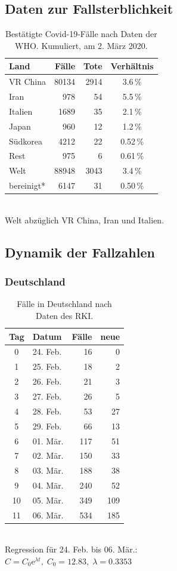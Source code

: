 \documentclass[a4paper,11pt,fleqn,twocolumn,twoside,dvipdfmx]{scrartcl}
\numberwithin{equation}{section}
\newcommand{\ee}{\mathrm e}
\newcommand{\strong}[1]{\textbf{#1}}
\begin{document}
\subsection{Daten zur Fallsterblichkeit}
\begin{table}[h]
\caption{Bestätigte Covid-19-Fälle\newline
nach Daten der WHO.\newline
Kumuliert, am 2. März 2020.}
\begin{tabular}{lrrc}
\toprule
\strong{Land} & \strong{Fälle} & \strong{Tote} & \strong{Verhältnis}\\
\midrule
VR China & 80134 & 2914 & 3.6\,\%\\
Iran & 978 & 54 & 5.5\,\%\\ 
Italien & 1689 & 35 & 2.1\,\%\\
Japan & 960 & 12 &  1.2\,\%\\
Südkorea & 4212 & 22 & 0.52\,\%\\
Rest & 975 & 6 & 0.61\,\%\\
\midrule
Welt & 88948 & 3043 & 3.4\,\%\\
bereinigt* & 6147 & 31 & 0.50\,\%\\
\bottomrule
\end{tabular}\\[4pt]
{\small *Welt abzüglich VR China, Iran und Italien.}
\end{table}

\subsection{Dynamik der Fallzahlen}

\subsubsection*{Deutschland}
\begin{table}[h]
\caption{Fälle in Deutschland\newline
nach Daten des RKI.}
\begin{tabular}{clrr}
\toprule
\strong{Tag} & \strong{Datum} & \strong{Fälle} & \strong{neue}\\
\midrule
0 & 24. Feb. & 16 & 0\\
1 & 25. Feb. & 18 & 2\\
2 & 26. Feb. & 21 & 3\\
3 & 27. Feb. & 26 & 5\\
4 & 28. Feb. & 53 & 27\\
5 & 29. Feb. & 66 & 13\\
6 & 01. Mär. & 117 & 51\\
7 & 02. Mär. & 150 & 33\\
8 & 03. Mär. & 188 & 38\\
9 & 04. Mär. & 240 & 52\\
10 & 05. Mär. & 349 & 109\\
11 & 06. Mär. & 534 & 185\\
\bottomrule
\end{tabular}\\[6pt]
Regression für 24. Feb. bis 06. Mär.:\\
$C = C_0\ee^{\lambda t},\; C_0=12.83,\; \lambda=0.3353$
\end{table}
\end{document}
